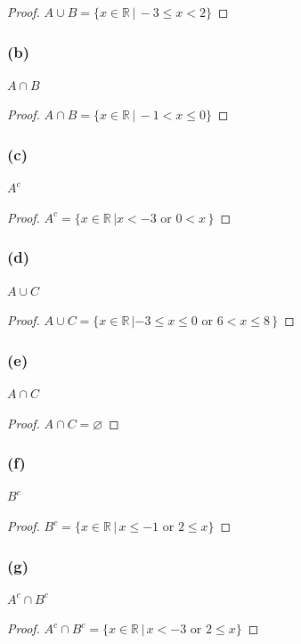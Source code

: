\documentclass[14pt]{extarticle}
\newcommand{\es}{\varnothing}
\newcommand{\R}{\mathbb{R}}
\begin{document}
\begin{proof}
\(A \cup B = \{x \in \R \, | \, -3 \leq x < 2\}\)
\end{proof}

\subsubsection{(b)}
$A \cap B$

\begin{proof}
\(A \cap B = \{x \in \R \, | \, -1 < x \leq 0\}\)
\end{proof}

\subsubsection{(c)}
$A^c$

\begin{proof}
\(A^c = \{x \in \R \, | x < -3 \text{ or } 0 < x\, \}\)
\end{proof}

\subsubsection{(d)}
$A \cup C$

\begin{proof}
\(A \cup C = \{x \in \R \, | -3 \leq x \leq 0 \text{ or } 6 < x \leq 8\, \}\)
\end{proof}

\subsubsection{(e)}
$A \cap C$

\begin{proof}
\(A \cap C = \es\)
\end{proof}

\subsubsection{(f)}
$B^c$

\begin{proof}
\(B^c = \{x \in \R \, | \, x \leq -1 \text{ or } 2 \leq x\}\)
\end{proof}

\subsubsection{(g)}
$A^c \cap B^c$

\begin{proof}
\(A^c \cap B^c = \{x \in \R \, | \, x < -3 \text{ or } 2 \leq x\}\)
\end{proof}
\end{document}
